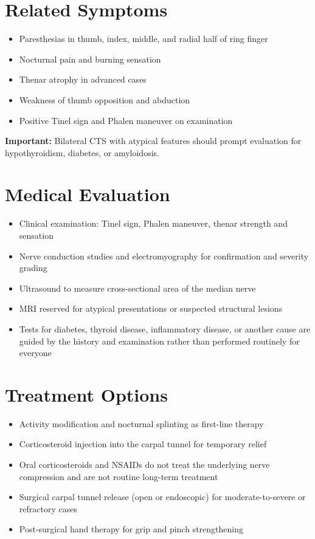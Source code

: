 \section*{Related Symptoms}
\begin{itemize}
 \item Paresthesias in thumb, index, middle, and radial half of ring finger
 \item Nocturnal pain and burning sensation
 \item Thenar atrophy in advanced cases
 \item Weakness of thumb opposition and abduction
 \item Positive Tinel sign and Phalen maneuver on examination
\end{itemize}
\textbf{Important:} Bilateral CTS with atypical features should prompt evaluation for hypothyroidism, diabetes, or amyloidosis.

\section*{Medical Evaluation}
\begin{itemize}
 \item Clinical examination: Tinel sign, Phalen maneuver, thenar strength and sensation
 \item Nerve conduction studies and electromyography for confirmation and severity grading
 \item Ultrasound to measure cross-sectional area of the median nerve
 \item MRI reserved for atypical presentations or suspected structural lesions
 \item Tests for diabetes, thyroid disease, inflammatory disease, or another cause are guided by the history and examination rather than performed routinely for everyone
\end{itemize}

\section*{Treatment Options}
\begin{itemize}
 \item Activity modification and nocturnal splinting as first-line therapy
 \item Corticosteroid injection into the carpal tunnel for temporary relief
 \item Oral corticosteroids and NSAIDs do not treat the underlying nerve compression and are not routine long-term treatment
 \item Surgical carpal tunnel release (open or endoscopic) for moderate-to-severe or refractory cases
 \item Post-surgical hand therapy for grip and pinch strengthening
\end{itemize}

